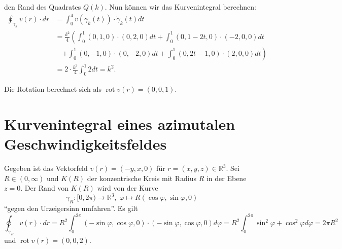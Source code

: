\documentclass[11pt]{article}
\theoremstyle{plain}
\theoremstyle{definition}
\theoremstyle{remark}
\newcommand{\R}{\mathbb{R}}
\newcommand{\ph}{\varphi}
\newcommand{\longto}{\longrightarrow}
\newcommand{\rot}{\operatorname{rot}}
\begin{document}
den Rand des Quadrates $Q(k)$. Nun können wir das Kurvenintegral berechnen:
\begin{align*}
\oint_{\gamma_k} v(r)\cdot dr &= \int_0^4 v(\gamma_k(t)) \cdot \dot \gamma_k (t) dt \\
&= \frac{k^2}{4} \left( \int_0^1 (0,1,0) \cdot (0,2,0) dt + \int_0^1 (0, 1-2t, 0) \cdot (-2,0,0) dt \right.\\
&\quad \left. + \int_0^1 (0,-1,0) \cdot (0,-2,0) dt + \int_0^1 (0, 2t-1, 0) \cdot (2,0,0) dt \right)\\
&= 2\cdot\frac{k^2}{4} \int_0^1 2 dt = k^2.
\end{align*}

Die Rotation berechnet sich als $\rot v(r) = (0,0,1)$.




\section{Kurvenintegral eines azimutalen Geschwindigkeitsfeldes}
Gegeben ist das Vektorfeld $v(r) = (-y, x, 0)$ für $r = (x,y,z) \in \R^3$. Sei $R \in (0, \infty)$ und $K(R)$ der konzentrische Kreis mit Radius $R$ in der Ebene $z = 0$. Der Rand von $K(R)$ wird von der Kurve
\[ \gamma_R : [0, 2\pi) \longto \R^3, \; \ph \longmapsto R (\cos\ph, \sin\ph, 0) \]
``gegen den Urzeigersinn umfahren''. Es gilt
\[ \oint_{\gamma_R} v(r) \cdot dr = R^2 \int_0^{2\pi} (-\sin\ph, \cos\ph, 0) \cdot (-\sin\ph, \cos\ph, 0) d\ph = R^2 \int_0^{2\pi} \sin^2 \ph + \cos^2 \ph d\ph = 2\pi R^2 \]
und $\rot v(r) = (0,0,2)$.
\end{document}
